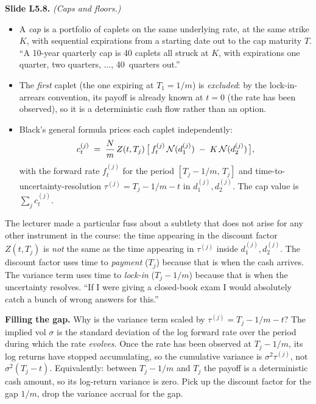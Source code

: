 \begin{keyblock}
\textbf{Slide L5.8.} \emph{(Caps and floors.)}
\begin{itemize}
  \item A \emph{cap} is a portfolio of caplets on the same underlying
        rate, at the same strike $K$, with sequential expirations from
        a starting date out to the cap maturity $T$. ``A 10-year
        quarterly cap is 40 caplets all struck at $K$, with
        expirations one quarter, two quarters, $\ldots$, 40~quarters
        out.''
  \item The \emph{first} caplet (the one expiring at $T_1 = 1/m$) is
        \emph{excluded}: by the lock-in-arrears convention, its payoff
        is already known at $t=0$ (the rate has been observed), so
        it is a deterministic cash flow rather than an option.
  \item Black's general formula prices each caplet independently:
        \[
          c^{(j)}_t \;=\; \frac{N}{m}\,Z(t, T_j)
            \,\bigl[\, f^{(j)}_t\,\mathcal{N}(d_1^{(j)})
                       \;-\; K\,\mathcal{N}(d_2^{(j)})\,\bigr],
        \]
        with the forward rate $f^{(j)}_t$ for the period
        $[T_j - 1/m,\, T_j]$ and time-to-uncertainty-resolution
        $\tau^{(j)} = T_j - 1/m - t$ in $d_1^{(j)}, d_2^{(j)}$. The
        cap value is $\sum_j c^{(j)}_t$.
\end{itemize}
\end{keyblock}

The lecturer made a particular fuss about a subtlety that does not
arise for any other instrument in the course: the time appearing in
the discount factor $Z(t, T_j)$ is \emph{not} the same as the time
appearing in $\tau^{(j)}$ inside $d_1^{(j)}, d_2^{(j)}$. The discount
factor uses time to \emph{payment} ($T_j$) because that is when the
cash arrives. The variance term uses time to \emph{lock-in} ($T_j -
1/m$) because that is when the uncertainty resolves. ``If I were
giving a closed-book exam I would absolutely catch a bunch of wrong
answers for this.''

\begin{tipblock}
\textbf{Filling the gap.} Why is the variance term scaled by
$\tau^{(j)} = T_j - 1/m - t$? The implied vol $\sigma$ is the standard
deviation of the log forward rate over the period during which the
rate \emph{evolves}. Once the rate has been observed at $T_j - 1/m$,
its log returns have stopped accumulating, so the cumulative variance
is $\sigma^2 \tau^{(j)}$, not $\sigma^2(T_j - t)$. Equivalently:
between $T_j - 1/m$ and $T_j$ the payoff is a deterministic cash
amount, so its log-return variance is zero. Pick up the discount
factor for the gap $1/m$, drop the variance accrual for the gap.
\end{tipblock}

